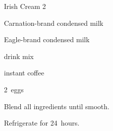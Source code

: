 \begin{recipe}{Irish Cream 2}{}{}

\begin{ingredients}
\item {} Carnation-brand condensed milk
\item {} Eagle-brand condensed milk
\item \tp{1\half}  drink mix
\item {} instant coffee
\item 2~eggs
\item \C{1\half} 
\end{ingredients}

\begin{directions}
\item Blend all ingredients until smooth.
\item Refrigerate for 24~hours.
\end{directions}

\end{recipe}

